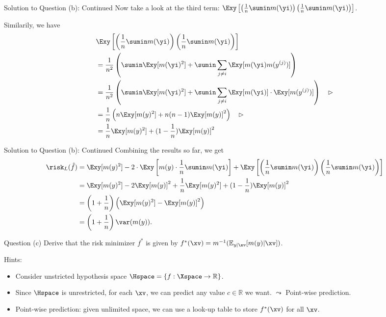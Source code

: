 \documentclass[aspectratio=169]{beamer}
\newcommand{\Eyx}{\mathbb{E}_{y|\xv}}
\newcommand{\my}{m(y)}
\begin{document}
\begin{frame}{Solution to Question (b): Continued}
	\small
	Now take a look at the third term: $\Exy \left[\left(\frac{1}{n}\sumin m(\yi) \right) \left( \frac{1}{n}\sumin m(\yi) \right) \right]$.
	\vspace{10pt}
	
	Similarily, we have
	\begin{align*}
		&\Exy \left[\left(\frac{1}{n}\sumin m(\yi) \right) \left( \frac{1}{n}\sumin m(\yi) \right) \right] \\
		&= \frac{1}{n^2} \left(\sumin \Exy[m(\yi)^2] + \sumin \sum_{j\neq i}\Exy[m(\yi) m(y^{(j)}) ] \right) \\
		&= \frac{1}{n^2} \left(\sumin \Exy[m(\yi)^2] + \sumin \sum_{j\neq i}\Exy[m(\yi)] \cdot \Exy[ m(y^{(j)})] \right) \quad \rhd \\
		&= \frac{1}{n}\left( n \Exy[m(y)^2] + n(n-1) \Exy[m(y)]^2 \right) \quad \rhd\\
		&=\frac{1}{n} \Exy[m(y)^2] + (1 - \frac{1}{n}) \Exy[m(y)]^2
	\end{align*}
\end{frame}

\begin{frame}{Solution to Question (b): Continued}
	\small
	Combining the results so far, we get
	\begin{align*}
		\risk_L(\hat{f}) &= \Exy[m(y)^2] -2 \cdot\Exy \left[m(y) \cdot \frac{1}{n} \sumin m(\yi) \right] + \Exy \left[\left(\frac{1}{n}\sumin m(\yi) \right) \left( \frac{1}{n}\sumin m(\yi) \right) \right] \\
		&= \Exy[m(y)^2] - 2 \Exy[m(y)]^2 + \frac{1}{n} \Exy[m(y)^2] + (1 - \frac{1}{n}) \Exy[m(y)]^2 \\
		&= \left(1 + \frac{1}{n} \right) \left(\Exy[m(y)^2] - \Exy[m(y)]^2 \right)\\ 
		&= \left(1 + \frac{1}{n} \right) \var(\my).
	\end{align*}
\end{frame}

\begin{frame}{Question (c)}
	Derive that the risk minimizer $f^*$ is given by $f^*(\xv) = m^{-1} (\Eyx [m(y) | \xv])$.
	\vspace{10pt}
	
	Hints:
	\begin{itemize}
		\item<2-> Consider unstricted hypothesis space $\Hspace = \{f: \Xspace \rightarrow \mathbb{R} \}$. 
		\item<3-> Since $\Hspace$ is unrestricted, for each $\xv$, we can predict any value $c \in \mathbb{R}$ we want. $\leadsto$ Point-wise prediction.
		\item<4-> Point-wise prediction: given unlimited space, we can use a look-up table to store $f^*(\xv)$ for all $\xv$.
	\end{itemize}
\end{frame}
\end{document}
